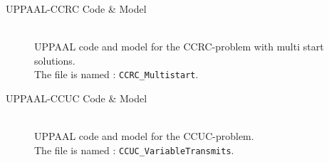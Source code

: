 \begin{description}
\item[UPPAAL-CCRC Code \& Model\label{UPPAAL-CCRC-Code}]\hfill\\
    UPPAAL code and model for the CCRC-problem with multi start solutions.\\
    The file is named : \texttt{CCRC\_Multistart}.
    
\item[UPPAAL-CCUC Code \& Model\label{UPPAAL-CCUC-Code}]\hfill\\
    UPPAAL code and model for the CCUC-problem.\\
    The file is named : \texttt{CCUC\_VariableTransmits}.
\end{description}